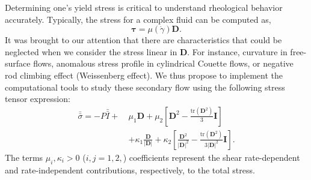 \par
Determining one's yield stress is critical to understand rheological behavior accurately. Typically, the stress for a complex fluid can be computed as,
\begin{equation}
   \boldsymbol{\tau} = \mu(\dot{\gamma}) \boldsymbol{D}.
\end{equation}
It was brought to our attention that there are characteristics that could be neglected when we consider the stress linear in $\boldsymbol{D}$. For instance, curvature in free-surface flows, anomalous stress profile in cylindrical Couette flows, or negative rod climbing effect (Weissenberg effect). We thus propose to implement the computational tools to study these secondary flow using the following stress tensor expression:
\begin{align}
\bar{\bar{\sigma}}
  = -P \bar{\bar{I}}  + \ &\mu_1 {\bm D} 
  + \mu_2  \left[ {\bm D}^2  - \frac{\text{tr}\left({\bm D}^2\right)}{3}{\bm I} \right]
  \nonumber \\
  & + \kappa_1 \frac{{\bm D}}{|{\bm D}|} 
  + \kappa_2  \left[ \frac{{\bm D}^2}{|{\bm D}|^2}  
  - \frac{\text{tr}\left({\bm D}^2\right)}{3|{\bm D}|^2}{\bm I} \right].
\end{align}
The terms $\mu_i, \kappa_i > 0 $ ($i, j = 1,2,$) coefficients represent the shear rate-dependent and rate-independent contributions, respectively, to the total stress.




